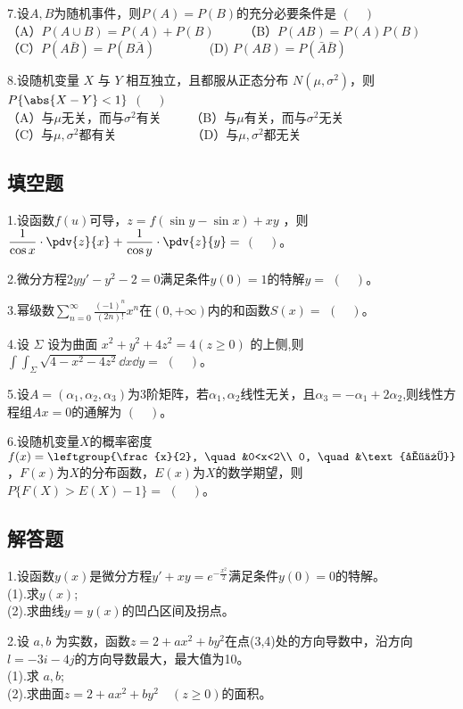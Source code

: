 7.设$A,B$为随机事件，则$P(A)=P(B)$的充分必要条件是 $(\quad)$\\
（A）$P( A \cup B)=P(A)+P(B) \qquad$  （B）$P(AB)=P(A)P(B)$\\
（C）$P(A\bar{ B })=P(B\bar{A}) \qquad \qquad$  (D) $P(AB)=P(\bar {A}\bar {B})$ 

8.设随机变量 $X$ 与 $Y$ 相互独立，且都服从正态分布 $N(\mu,\sigma ^2)$，则$P \{\abs{X-Y}<1\}$ $(\quad)$\\
（A）与$\mu$无关，而与$\sigma ^2$有关 $\qquad$（B）与$\mu$有关，而与$\sigma ^2$无关\\
（C）与$\mu ,\sigma ^2$都有关$\qquad \qquad \qquad$（D）与$\mu ,\sigma ^2$都无关



\subsection{填空题}
1.设函数$f(u)$可导，$z=f(\sin y-\sin x)+xy$ ，则 $\displaystyle \frac{1}{\cos x}\cdot \pdv{z}{x}+\frac{1}{\cos y}\cdot \pdv{z}{y}=$ $(\quad)$。

2.微分方程$2yy'-y^2-2=0$满足条件$y(0)=1$的特解$y=$ $(\quad)$。

3.幂级数$\displaystyle \sum_{n=0}^\infty \frac{(-1)^n}{(2n)!} x^n$在$(0,+\infty)$内的和函数$S(x)=$ $(\quad)$。

4.设 $\Sigma$ 设为曲面 $x^2+y^2+4z^2=4 (z\ge 0)$ 的上侧,则$\int\int_{\Sigma} \sqrt{4-x^2-4z^2}\dd{x}\dd{y}=$ $(\quad)$。

5.设$A=(\alpha_1,\alpha_2,\alpha_3)$为3阶矩阵，若$\alpha_1,\alpha_2$线性无关，且$\alpha_3=-\alpha_1+2\alpha_2$,则线性方程组$Ax=0$的通解为 $(\quad)$。

6.设随机变量$X$的概率密度$f(x)=\leftgroup{\frac{x}{2}, \quad &0<x<2\\  0, \quad &\text{其他}}$ ，$F(x)$为$X$的分布函数，$E(x)$为$X$的数学期望，则$P\{F(X)>E(X)-1\}=$ $(\quad)$。


\subsection{解答题}
1.设函数$y(x)$是微分方程$y'+xy=e^{-\frac{x^2}{2}}$满足条件$y(0)=0$的特解。\\
(1).求$y(x)$;\\
(2).求曲线$y=y(x)$的凹凸区间及拐点。

2.设 $a,b$ 为实数，函数$z=2+ax^2+by^2$在点(3,4)处的方向导数中，沿方向$l=-3i-4j$的方向导数最大，最大值为10。\\
(1).求 $a,b$;\\
(2).求曲面$z=2+ax^2+by^2 \quad(z\geqslant 0)$的面积。

